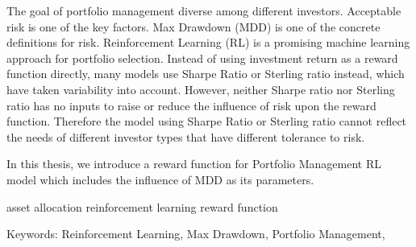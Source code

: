\begin{abstracten}
The goal of portfolio management diverse among different investors. Acceptable risk is one of the key factors. Max Drawdown (MDD) is one of the concrete definitions for risk. Reinforcement Learning (RL) is a promising machine learning approach for portfolio selection. Instead of using investment return as a reward function directly, many models use Sharpe Ratio \cite{Sharpe49} or Sterling ratio instead, which have taken variability into account. However, neither Sharpe ratio nor Sterling ratio has no inputs to raise or reduce the influence of risk upon the reward function. Therefore the model using Sharpe Ratio \cite{Sharpe49} or Sterling ratio cannot reflect the needs of different investor types that have different tolerance to risk.
\par
In this thesis, we introduce a reward function for Portfolio Management RL model which includes the influence of MDD as its parameters.   

asset allocation reinforcement learning reward function


\noindent
Keywords: Reinforcement Learning, Max Drawdown, Portfolio Management,
\end{abstracten}
